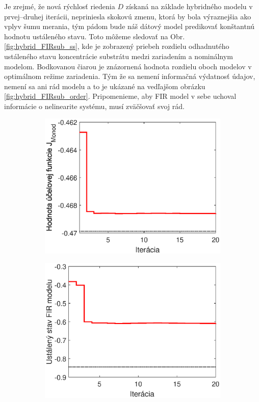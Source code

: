 Je zrejmé, že nová rýchlosť riedenia $ D $ získaná na základe hybridného modelu v prvej--druhej iterácii, nepriniesla skokovú zmenu, ktorá by bola výraznejšia ako vplyv šumu merania, tým pádom bude náš dátový model predikovať konštantnú hodnotu ustáleného stavu. Toto môžeme sledovať na Obr. \ref{fig:hybrid_FIRsub_ss}, kde je zobrazený priebeh rozdielu odhadnutého ustáleného stavu koncentrácie substrátu medzi zariadením a nominálnym modelom. Bodkovanou čiarou je znázornená hodnota rozdielu oboch modelov v optimálnom režime zariadenia. Tým že sa nemení informačná výdatnosť údajov, nemení sa ani rád modelu a to je ukázané na vedľajšom obrázku \ref{fig:hybrid_FIRsub_order}. Pripomenieme, aby FIR model v sebe uchoval informácie o nelinearite systému, musí zväčšovať svoj rád. 
\begin{figure}
	\centering
	\begin{subfigure}[b]{0.49\textwidth}
		\centering
		\includegraphics[width=\linewidth]{images/hybrid_sub_costFun}
		\caption{}
		\label{fig:hybrid_sub_costFun}
	\end{subfigure}
	\hfill
	\begin{subfigure}[b]{0.49\textwidth}
		\centering
		\includegraphics[width=\linewidth]{images/hybrid_sub_ss}

\end{subfigure}
\end{figure}
